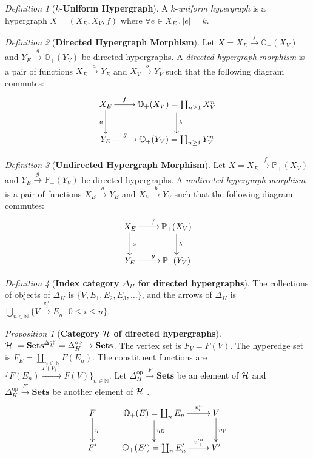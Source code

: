 \documentclass[10pt]{article}
\newcommand{\onearrow}[3]{\mbox{$#1 \stackrel{#2}{\longrightarrow} #3$}}
\newcommand{\calH}{\mbox{${\cal H}\ $}}
\theoremstyle{remark}
\newtheorem{definition}{Definition}
\newtheorem{proposition}{Proposition}
\begin{document}
\begin{definition}[$k$-\textbf{Uniform Hypergraph}]
A $k$-\emph{uniform hypergraph} is a hypergraph $X=(X_E, X_V, f)$ where $\forall e \in X_E \, . \, |e| = k$.
\end{definition}

\begin{definition}[\textbf{Directed Hypergraph Morphism}]
Let $X=\onearrow{X_E}{f}{\mathbb{O}_{+} (X_V)}$ and \onearrow{Y_E}{g}{\mathbb{O}_{+} (Y_V)}
be directed hypergraphs. A \emph{directed hypergraph morphism} is a pair of
functions \onearrow{X_E}{a}{Y_E} and \onearrow{X_V}{b}{Y_V} such that the following diagram commutes:
$$
\xymatrix {
X_E      \ar[r]^-{f} \ar[d]_{a}   &     {\mathbb{O}_{+} (X_V) = \coprod_{n \geq 1} X_V^n} \ar[d]^{b} \\
Y_E      \ar[r]^-{g}     &  \mathbb{O}_{+} (Y_V) = \coprod_{n \geq 1} Y_V^n
}
$$
\end{definition}

\begin{definition}[\textbf{Undirected Hypergraph Morphism}]
Let $X=\onearrow{X_E}{f}{\mathbb{P}_{+} (X_V)}$ and \onearrow{Y_E}{g}{\mathbb{P}_{+} (Y_V)} be directed hypergraphs. A \emph{undirected hypergraph morphism} is a pair of functions \onearrow{X_E}{a}{Y_E} and \onearrow{X_V}{b}{Y_V} such that the following diagram commutes:
$$
\xymatrix{
X_E  \ar[d]^a \ar[r]^f  & \mathbb{P}_{+} (X_V) \ar[d]^b \\ 
Y_E          \ar[r]^g       & \mathbb{P}_{+} (Y_V)
}
$$
\end{definition}

\begin{definition}[\textbf{Index category $\Delta_H$ for directed hypergraphs}]
The collections of objects of $\Delta_H$ is $\{V, E_1, E_2, E_3, \ldots \}$, and the arrows of $\Delta_H$ is $\bigcup_{n \in \mathbb{N}} \{ \onearrow{V}{v_i^n}{E_n} \, | \, 0 \leq i \leq n \}$.
\end{definition}

\begin{proposition}[\textbf{Category \calH of directed hypergraphs}]
$\calH = \mathbf{Sets}^{\Delta_H^{\text{op}}} = \Delta_H^{\text{op}} \rightarrow \mathbf{Sets}$. The vertex set is $F_V = F(V)$. The hyperedge set is $F_E = \coprod_{n \in \mathbb{N}} {F(E_n)}$. The constituent functions are $\{ \onearrow{F(E_n)}{F(V_i)}{F(V)}\}_{n \in \mathbb{N}}$. Let \onearrow{\Delta_H^{\text{op}}}{F}{\mathbf{Sets}} be an element of \calH and \onearrow{\Delta_H^{\text{op}}}{F'}{\mathbf{Sets}} be another element of \calH.
$$
\xymatrix{
F  \ar[d]^{\eta} & {\mathbb{O}_{+} (E) = \coprod_{n}E_n} \ar[r]^-{v_i^n} \ar[d]^{\eta_E} & V \ar[d]^{\eta_V} \\
F'                      & {\mathbb{O}_{+} (E') = \coprod_{n}E'_n} \ar[r]^-{{v'}_i^n}                         & V' \\
}
$$
\end{proposition}
\end{document}
